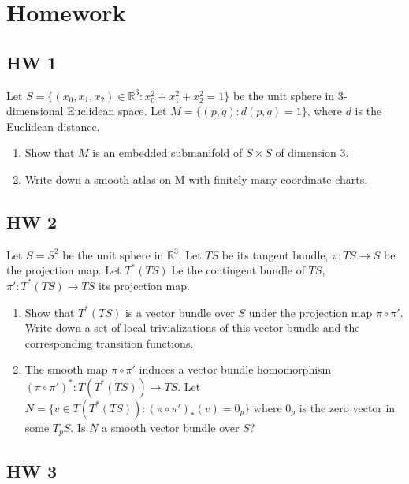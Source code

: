 \documentclass{article}
\theoremstyle{definition}
\begin{document}
\newpage

\section{Homework}

\subsection{HW 1}

Let $S=\{(x_0, x_1, x_2)\in\mathbb{R}^3: x_0^2+x_1^2+x_2^2=1\}$ be the unit sphere in 3-dimensional Euclidean space. Let $M=\{(p, q): d(p, q)=1\}$, where $d$ is the Euclidean distance.

\begin{enumerate}[(1)]
    \item Show that $M$ is an embedded submanifold of $S\times S$ of dimension $3$.
    \item Write down a smooth atlas on M with finitely many coordinate charts. 
\end{enumerate}
\newpage

\subsection{HW 2}

Let $S=S^2$ be the unit sphere in $\mathbb{R}^3$. Let $TS$ be its tangent bundle, $\pi: TS\rightarrow S$ be the projection map. Let $T^*(TS)$ be the contingent bundle of $TS$,
$\pi': T^*(TS)\rightarrow TS$ its projection map.
\begin{enumerate}[(1)]
    \item Show that $T^*(TS)$
is a vector bundle over $S$ under the projection map $\pi\circ \pi'$. Write down a set of local trivializations of this vector bundle and the corresponding transition functions.
\item The smooth map $\pi\circ \pi'$ induces a vector bundle homomorphism $(\pi\circ \pi')^*: T(T^*(TS))\rightarrow TS$. Let $N=\{v\in T(T^*(TS)): (\pi\circ \pi')_*(v)=0_p\}$ where $0_p$ is the zero vector in some $T_pS$. Is $N$ a smooth vector bundle over $S$?
\end{enumerate}

\newpage
\subsection{HW 3}
\end{document}
